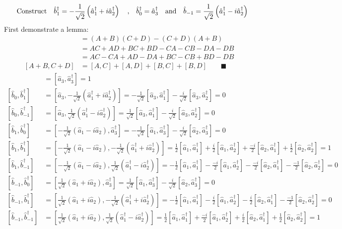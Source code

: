 \documentclass{amsart}
\begin{document}
\[\qq{Construct}\hat{b}^\dagger_1=-\frac{1}{\sqrt{2}}\left(\hat{a}^\dagger_1+i\hat{a}^\dagger_2\right)\qq{,}\hat{b}^\dagger_0=\hat{a}^\dagger_3\qq{and}\hat{b}_{-1}=\frac{1}{\sqrt{2}}\left(\hat{a}^\dagger_1-i\hat{a}^\dagger_2\right)\]
First demonstrate a lemma:
\begin{align*}
[A+B,C+D]&=(A+B)(C+D)-(C+D)(A+B)\\
&=AC+AD+BC+BD-CA-CB-DA-DB\\
&=AC-CA+AD-DA+BC-CB+BD-DB\\
[A+B,C+D]&=[A,C]+[A,D]+[B,C]+[B,D]\qquad\blacksquare
\end{align*}
\begin{align*}
[\hat{b}_0,\hat{b}^\dagger_0]&=[\hat{a}_3,\hat{a}^\dagger_3]=1\\
[\hat{b}_0,\hat{b}^\dagger_1]&=[\hat{a}_3,-\frac{1}{\sqrt{2}}\left(\hat{a}^\dagger_1+i\hat{a}^\dagger_2\right)]=-\frac{1}{\sqrt{2}}[\hat{a}_3,\hat{a}^\dagger_1]-\frac{i}{\sqrt{2}}[\hat{a}_3,\hat{a}^\dagger_2]=0\\
[\hat{b}_0,\hat{b}^\dagger_{-1}]&=[\hat{a}_3,\frac{1}{\sqrt{2}}\left(\hat{a}^\dagger_1-i\hat{a}^\dagger_2\right)]=\frac{1}{\sqrt{2}}[\hat{a}_3,\hat{a}^\dagger_1]-\frac{i}{\sqrt{2}}[\hat{a}_3,\hat{a}^\dagger_2]=0\\
[\hat{b}_1,\hat{b}^\dagger_0]&=[-\frac{1}{\sqrt{2}}\left(\hat{a}_1-i\hat{a}_2\right),\hat{a}^\dagger_3]=-\frac{1}{\sqrt{2}}[\hat{a}_1,\hat{a}^\dagger_3]-\frac{i}{\sqrt{2}}[\hat{a}_2,\hat{a}^\dagger_3]=0\\
[\hat{b}_1,\hat{b}^\dagger_1]&=[-\frac{1}{\sqrt{2}}\left(\hat{a}_1-i\hat{a}_2\right),-\frac{1}{\sqrt{2}}\left(\hat{a}^\dagger_1+i\hat{a}^\dagger_2\right)]=\frac{1}{2}[\hat{a}_1,\hat{a}^\dagger_1]+\frac{i}{2}[\hat{a}_1,\hat{a}^\dagger_2]+\frac{-i}{2}[\hat{a}_2,\hat{a}^\dagger_1]+\frac{1}{2}[\hat{a}_2,\hat{a}^\dagger_2]=1\\
[\hat{b}_1,\hat{b}^\dagger_{-1}]&=[-\frac{1}{\sqrt{2}}\left(\hat{a}_1-i\hat{a}_2\right),\frac{1}{\sqrt{2}}\left(\hat{a}^\dagger_1-i\hat{a}^\dagger_2\right)]=-\frac{1}{2}[\hat{a}_1,\hat{a}^\dagger_1]-\frac{-i}{2}[\hat{a}_1,\hat{a}^\dagger_2]-\frac{-i}{2}[\hat{a}_2,\hat{a}^\dagger_1]-\frac{-1}{2}[\hat{a}_2,\hat{a}^\dagger_2]=0\\
[\hat{b}_{-1},\hat{b}^\dagger_0]&=[\frac{1}{\sqrt{2}}\left(\hat{a}_1+i\hat{a}_2\right),\hat{a}^\dagger_3]=\frac{1}{\sqrt{2}}[\hat{a}_1,\hat{a}^\dagger_3]-\frac{i}{\sqrt{2}}[\hat{a}_2,\hat{a}^\dagger_3]=0\\
[\hat{b}_{-1},\hat{b}^\dagger_1]&=[\frac{1}{\sqrt{2}}\left(\hat{a}_1+i\hat{a}_2\right),-\frac{1}{\sqrt{2}}\left(\hat{a}^\dagger_1+i\hat{a}^\dagger_2\right)]=-\frac{1}{2}[\hat{a}_1,\hat{a}^\dagger_1]-\frac{i}{2}[\hat{a}_1,\hat{a}^\dagger_2]-\frac{i}{2}[\hat{a}_2,\hat{a}^\dagger_1]-\frac{-1}{2}[\hat{a}_2,\hat{a}^\dagger_2]=0\\
[\hat{b}_{-1},\hat{b}^\dagger_{-1}]&=[\frac{1}{\sqrt{2}}\left(\hat{a}_1+i\hat{a}_2\right),\frac{1}{\sqrt{2}}\left(\hat{a}^\dagger_1-i\hat{a}^\dagger_2\right)]=\frac{1}{2}[\hat{a}_1,\hat{a}^\dagger_1]+\frac{-i}{2}[\hat{a}_1,\hat{a}^\dagger_2]+\frac{i}{2}[\hat{a}_2,\hat{a}^\dagger_1]+\frac{1}{2}[\hat{a}_2,\hat{a}^\dagger_2]=1
\end{align*}
\end{document}
